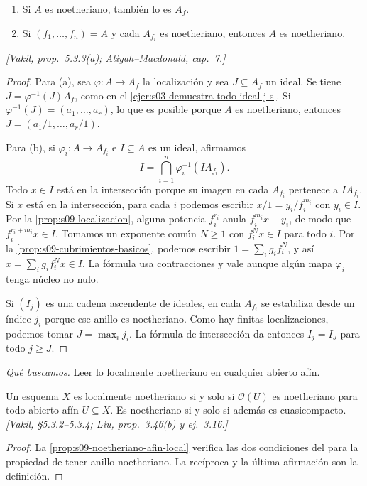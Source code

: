 \begin{prop}
\label{prop:s09-noetheriano-afin-local}
\begin{enumerate}[label=(\alph*)]
\item Si $A$ es noetheriano, también lo es $A_f$.
\item Si $(f_1,\ldots,f_n)=A$ y cada $A_{f_i}$ es noetheriano, entonces $A$ es noetheriano.
\end{enumerate}
\emph{[Vakil, prop.~5.3.3(a); Atiyah--Macdonald, cap.~7.]}
\end{prop}
\begin{proof}
Para (a), sea $\varphi\colon A\to A_f$ la localización y sea $J\subseteq A_f$ un ideal. Se tiene $J=\varphi^{-1}(J)A_f$, como en el \cref{ejer:s03-demuestra-todo-ideal-j-s}. Si $\varphi^{-1}(J)=(a_1,\ldots,a_r)$, lo que es posible porque $A$ es noetheriano, entonces $J=(a_1/1,\ldots,a_r/1)$.

Para (b), si $\varphi_i\colon A\to A_{f_i}$ e $I\subseteq A$ es un ideal, afirmamos
\[
I=\bigcap_{i=1}^n\varphi_i^{-1}(IA_{f_i}).
\]
Todo $x\in I$ está en la intersección porque su imagen en cada $A_{f_i}$ pertenece a $IA_{f_i}$. Si $x$ está en la intersección, para cada $i$ podemos escribir $x/1=y_i/f_i^{m_i}$ con $y_i\in I$. Por la \cref{prop:s09-localizacion}, alguna potencia $f_i^{r_i}$ anula $f_i^{m_i}x-y_i$, de modo que $f_i^{r_i+m_i}x\in I$. Tomamos un exponente común $N\ge1$ con $f_i^Nx\in I$ para todo $i$. Por la \cref{prop:s09-cubrimientos-basicos}, podemos escribir $1=\sum_i g_if_i^N$, y así $x=\sum_i g_if_i^Nx\in I$. La fórmula usa contracciones y vale aunque algún mapa $\varphi_i$ tenga núcleo no nulo.

Si $(I_j)$ es una cadena ascendente de ideales, en cada $A_{f_i}$ se estabiliza desde un índice $j_i$ porque ese anillo es noetheriano. Como hay finitas localizaciones, podemos tomar $J=\max_i j_i$. La fórmula de intersección da entonces $I_j=I_J$ para todo $j\ge J$.
\end{proof}

\emph{Qué buscamos.} Leer lo localmente noetheriano en cualquier abierto afín.

\begin{coro}
\label{coro:s09-localmente-noetheriano}
Un esquema $X$ es localmente noetheriano si y solo si $\mathcal O(U)$ es noetheriano para todo abierto afín $U\subseteq X$. Es noetheriano si y solo si además es cuasicompacto. \emph{[Vakil, \S5.3.2--5.3.4; Liu, prop.~3.46(b) y ej.~3.16.]}
\end{coro}
\begin{proof}
La \cref{prop:s09-noetheriano-afin-local} verifica las dos condiciones del  para la propiedad de tener anillo noetheriano. La recíproca y la última afirmación son la definición.
\end{proof}

